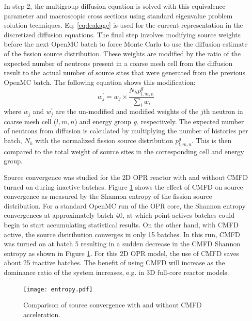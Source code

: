 \documentclass{ansconf}
\begin{document}
In step 2, the multigroup diffusion equation is solved with this equivalence
parameter and macroscopic cross sections using standard eigenvalue problem
solution techniques. Eq. \eqref{eq:leakage} is used for the current representation in 
the discretized diffusion equations. The final step involves modifying source weights 
before the next OpenMC batch to force Monte Carlo to use the diffusion estimate of the
fission source distribution. These weights are modified by the ratio of the
expected number of neutrons present in a coarse mesh cell from the diffusion
result to the actual number of source sites that were generated from the
previous OpenMC batch. The following equation shows this modification:
\begin{equation}
  \label{eq:weight}
  w_{j}^{\prime} = w_{j} \times \frac{N_{h}p_{l,m,n}^{g}}{\sum_{i}w_{i}}
\end{equation}
where $w_{j}$ and $w_{j}^{\prime}$ are the un-modified and modified weights of
the $j$th neutron in coarse mesh cell ($l,m,n$) and energy group $g$,
respectively. The expected number of neutrons from diffusion is calculated by
multiplying the number of histories per batch, $N_{h}$ with the normalized
fission source distribution $p_{l,m,n}^{g}$. This is then compared to the total
weight of source sites in the corresponding cell and energy group.

Source convergence was studied for the 2D OPR reactor with and without CMFD
turned on during inactive batches.  Figure \ref{fig:cmfd} shows the effect of
CMFD on source convergence as measured by the Shannon entropy of the fission
source distribution. For a standard OpenMC run of the OPR core, the Shannon
entropy convergences at approximately batch 40, at which point actives batches
could begin to start accumulating statistical results. On the other hand, with
CMFD active, the source distribution converges in only 15 batches. In this run,
CMFD was turned on at batch 5 resulting in a sudden decrease in the CMFD Shannon
entropy as shown in Figure \ref{fig:cmfd}. For this 2D OPR model, the use of CMFD
saves about 25 inactive batches. The benefit of using CMFD will increase as the
dominance ratio of the system increases, e.g. in 3D full-core reactor models.

\begin{figure}[!t]
  \centering
  \texttt{[image: entropy.pdf]}
  \caption{Comparison of source convergence with and without CMFD acceleration.}
  \label{fig:cmfd}
\end{figure}  
\end{document}
